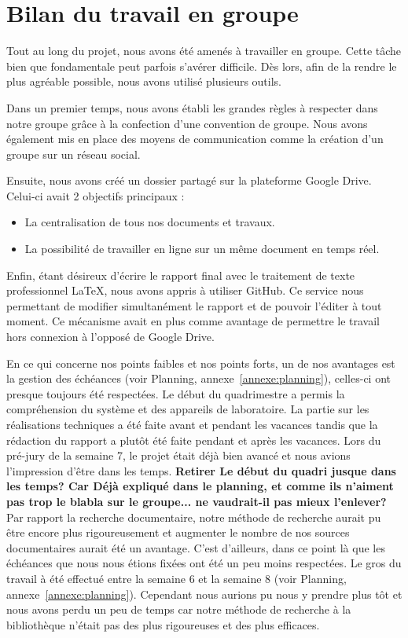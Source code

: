 \section{Bilan du travail en groupe}

Tout au long du projet, nous avons été amenés à travailler en groupe. Cette tâche bien que fondamentale peut parfois s'avérer difficile. Dès lors, afin de la rendre le plus agréable possible, nous avons utilisé plusieurs outils.

Dans un premier temps, nous avons établi les grandes règles à respecter dans notre groupe grâce à la confection d'une convention de groupe. Nous avons également mis en place des moyens de communication comme la création d'un groupe sur un réseau social.

Ensuite, nous avons créé un dossier partagé sur la plateforme Google Drive. Celui-ci avait 2 objectifs principaux :
\begin{itemize}
\item La centralisation de tous nos documents et travaux.
\item La possibilité de travailler en ligne sur un même document en temps réel.
\end{itemize}

Enfin, étant désireux d'écrire le rapport final avec le traitement de texte professionnel \LaTeX, nous avons appris à utiliser GitHub. Ce service nous permettant de modifier simultanément le rapport et de pouvoir l'éditer à tout moment. Ce mécanisme avait en plus comme avantage de permettre le travail hors connexion à l'opposé de Google Drive.

En ce qui concerne nos points faibles et nos points forts, un de nos avantages est la gestion des échéances (voir Planning, annexe~\ref{annexe:planning}), celles-ci ont presque toujours été respectées. 
Le début du quadrimestre a permis la compréhension du système et des appareils de laboratoire. La partie sur les réalisations techniques a été faite avant et pendant les vacances tandis que la rédaction du rapport a plutôt été faite pendant et après les vacances. Lors du pré-jury de la semaine 7, le projet était déjà bien avancé et nous avions l'impression d'être dans les temps.
\textbf{Retirer \og Le début du quadri \fg jusque \og dans les temps\fg ? Car  Déjà expliqué dans le planning, et comme ils n'aiment pas trop le blabla sur le groupe... ne vaudrait-il pas mieux l'enlever? }
Par rapport la recherche documentaire, notre méthode de recherche aurait pu être encore plus rigoureusement et augmenter le nombre de nos sources documentaires aurait été un avantage. C'est d'ailleurs, dans ce point là que les échéances que nous nous étions fixées ont été un peu moins respectées. Le gros du travail à été effectué entre la semaine 6 et la semaine 8 (voir Planning, annexe~\ref{annexe:planning}). Cependant nous aurions pu nous y prendre plus tôt et nous avons perdu un peu de temps car notre méthode de recherche à la bibliothèque n'était pas des plus rigoureuses et des plus efficaces.


